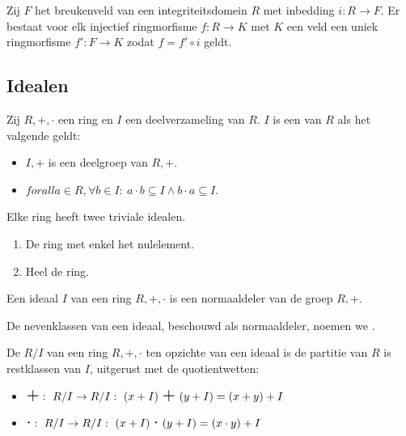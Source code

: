 \documentclass[main.tex]{subfiles}
\begin{document}
\begin{ei}
  Zij $F$ het breukenveld van een integriteitsdomein $R$ met inbedding $i: R \rightarrow F$.
  Er bestaat voor elk injectief ringmorfisme $f: R \rightarrow K$ met $K$ een veld een uniek ringmorfisme $f': F \rightarrow K$ zodat $f = f' \circ i$ geldt.
\end{ei}

\subsection{Idealen}
\label{sec:idealen}


\begin{de}
  Zij $R,+,\cdot$ een ring en $I$ een deelverzameling van $R$.
  $I$ is een  van $R$ als het valgende geldt:
  \begin{itemize}
  \item $I,+$ is een deelgroep van $R,+$.
  \item $forall a \in R, \forall b \in I:\ a\cdot b \subseteq I \wedge b\cdot a \subseteq I$. 
  \end{itemize}
\end{de}

\begin{st}
  Elke ring heeft twee triviale idealen.
  \begin{enumerate}
  \item De ring met enkel het nulelement.
  \item Heel de ring.
  \end{enumerate}
\end{st}

\begin{ei}
  Een ideaal $I$ van een ring $R,+,\cdot$ is een normaaldeler van de groep $R,+$.
\end{ei}

\begin{de}
  De nevenklassen van een ideaal, beschouwd als normaaldeler, noemen we .
\end{de}

\begin{de}
  De  $R/I$ van een ring $R,+,\cdot$ ten opzichte van een ideaal is de partitie van $R$ is restklassen van $I$, uitgerust met de quotientwetten:
  \begin{itemize}
  \item $\scalebox{1.5}{$+$}:\ R/I \rightarrow R/I:\ (x+I)\ \scalebox{1.5}{$+$}\ (y+I) = (x+y)+I$
  \item $\scalebox{1.5}{$\cdot$}:\ R/I \rightarrow R/I:\ (x+I)\ \scalebox{1.5}{$\cdot$}\ (y+I) = (x\cdot y) + I$
  \end{itemize}
\end{de}




\end{document}
